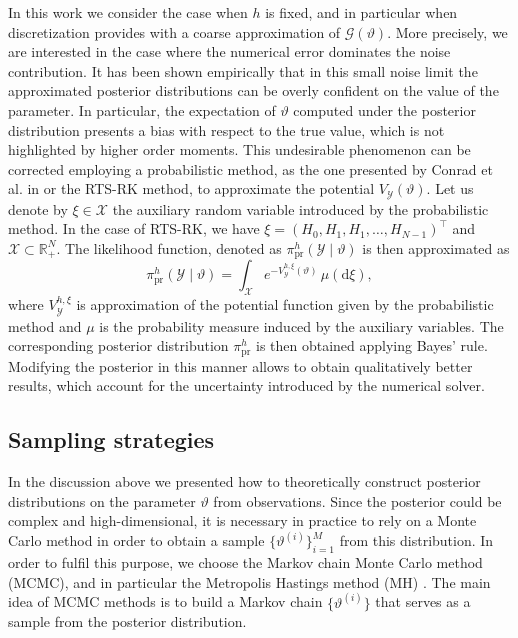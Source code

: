 \documentclass{siamart1116}
\numberwithin{theorem}{section}
\renewcommand{\theta}{\vartheta}
\newcommand{\R}{\mathbb{R}}
\newcommand{\dd}{\mathrm{d}}
\begin{document}
In this work we consider the case when $h$ is fixed, and in particular when discretization provides with a coarse approximation of $\mathcal{G}(\theta)$. More precisely, we are interested in the case where the numerical error dominates the noise contribution. It has been shown empirically \cite{CGS16, COS17} that in this small noise limit the approximated posterior distributions can be overly confident on the value of the parameter. In particular, the expectation of $\theta$ computed under the posterior distribution presents a bias with respect to the true value, which is not highlighted by higher order moments. This undesirable phenomenon can be corrected employing a probabilistic method, as the one presented by Conrad et al. in \cite{CGS16} or the RTS-RK method, to approximate the potential $V_\mathcal{Y}(\theta)$. Let us denote by $\xi \in \mathcal{X}$ the auxiliary random variable introduced by the probabilistic method. In the case of RTS-RK, we have $\xi = (H_0, H_1, H_1, \ldots, H_{N-1})^\top$ and $\mathcal{X} \subset \R_+^N$. The likelihood function, denoted as  $\pi^h_{\mathrm{pr}}(\mathcal{Y}\mid\theta)$ is then approximated as 
\begin{equation}\label{eq:LikelihoodProb}
	\pi^h_{\mathrm{pr}}(\mathcal{Y}\mid \theta) = \int_{\mathcal{X}} e^{-V^{h,\xi}_{\mathcal{Y}}(\theta)} \, \mu(\dd \xi),
\end{equation}
where $V^{h, \xi}_{\mathcal{Y}}$ is approximation of the potential function given by the probabilistic method and $\mu$ is the probability measure induced by the auxiliary variables. The corresponding posterior distribution $\pi^h_{\mathrm{pr}}$ is then obtained applying Bayes' rule. Modifying the posterior in this manner allows to obtain qualitatively better results, which account for the uncertainty introduced by the numerical solver.

\subsection{Sampling strategies} In the discussion above we presented how to theoretically construct posterior distributions on the parameter $\theta$ from observations. Since the posterior could be complex and high-dimensional, it is  necessary in practice to rely on a Monte Carlo method in order to obtain a sample $\{\theta^{(i)}\}_{i=1}^M$ from this distribution. In order to fulfil this purpose, we choose the Markov chain Monte Carlo method (MCMC), and in particular the Metropolis Hastings method (MH) \cite{KaS05}. The main idea of MCMC methods is to build a Markov chain $\{\theta^{(i)}\}$ that serves as a sample from the posterior distribution.
\end{document}

